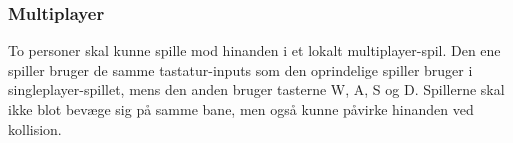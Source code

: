 \subsubsection*{Multiplayer}
To personer skal kunne spille mod hinanden i et lokalt multiplayer-spil. Den ene spiller bruger de samme tastatur-inputs som den oprindelige spiller bruger i singleplayer-spillet, mens den anden bruger tasterne W, A, S og D. Spillerne skal ikke blot bevæge sig på samme bane, men også kunne påvirke hinanden ved kollision.